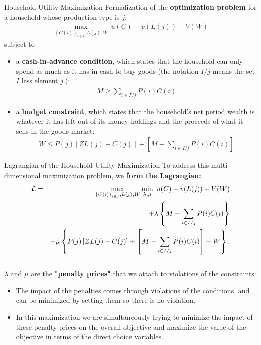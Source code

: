 \documentclass[10pt,c,aspectratio=1610,handout]{beamer}
\begin{document}
\begin{frame}{Household Utility Maximization}%
  Formalization of the \textbf{optimization problem} for a household whose production type is $j$:%
  \begin{align*}%
    \max_{\left\{ C(i)\right\} _{i\in I},L(j),W}\ u(C)-v(L(j))+V(W)%
  \end{align*}%
  subject to%
  \pause%
  \begin{itemize}%
    \item[$\blacktriangleright$] a \textbf{cash-in-advance condition}, which states that the household can only spend as much as it has in cash to buy goods (the notation $I/j$ means the set $I$ less element $j$.):%
    \begin{align*}%
      M \geq \sum_{i\in I/j}P(i)C(i)
    \end{align*}%
    \pause%
    \item[$\blacktriangleright$] a \textbf{budget constraint}, which states that the household's net period wealth is whatever it has left out of its money holdings and the proceeds of what it sells in the goods market:%
    \begin{align*}%
      W \leq P(j)\left[ ZL(j)-C(j)\right] +\left[ M-\sum_{i\in I/j}P(i)C(i)\right]%
    \end{align*}%
  \end{itemize}%
\end{frame}%
\begin{frame}{Lagrangian of the Household Utility Maximization}%
  To address this multi-dimensional maximization problem, we \textbf{form the Lagrangian:}%
  \begin{eqnarray}%
    \mathcal{L} &=&\max_{\left\{ C(i)\right\} _{i\in I},L(j),W}\min_{\lambda,\mu }\ u(C)-v(L(j))+V(W)  \label{Lagrangian 1} \\%
    &&+\lambda \left\{ M-\sum_{i\in I/j}P(i)C(i)\right\}  \notag \\%
    &&+\mu \left\{ P(j)\left[ ZL(j)-C(j)\right] +\left[ M-\sum_{i\in I/j}P(i)C(i)\right] -W\right\} .  \notag%
  \end{eqnarray}\\%
  \vspace*{0.2in}%
  \pause%
  $\lambda $ and $\mu $ are the \textbf{"penalty prices"} that we attach to violations of the constraints:%
  \begin{itemize}%
    \small%
    \item[$\blacktriangleright$] The impact of the penalties comes through violations of the conditions, and can be minimized by setting them so there is no violation. %
    \item[$\blacktriangleright$] In this maximization we are simultaneously trying to minimize the impact of these penalty prices on the overall objective and maximize the value of the objective in terms of the direct choice variables.%
  \end{itemize}%
\end{frame}%
\end{document}
